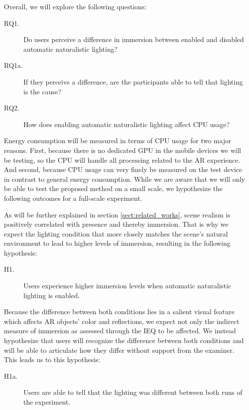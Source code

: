 \documentclass[12pt,twoside,english]{article}
\begin{document}
Overall, we will explore the following questions:

\begin{description}
    \item[RQ1.] Do users perceive a difference in immersion between enabled and disabled automatic naturalistic lighting?
    \item[RQ1a.] If they perceive a difference, are the participants able to tell that lighting is the cause?
    \item[RQ2.] How does enabling automatic naturalistic lighting affect \gls{CPU} usage?
\end{description}

Energy consumption will be measured in terms of \gls{CPU} usage for two major reasons.
First, because there is no dedicated \gls{GPU} in the mobile devices we will be testing, so the \gls{CPU} will handle all processing related to the \gls{AR} experience.
And second, because CPU usage can very finely be measured on the test device in contrast to general energy consumption.
While we are aware that we will only be able to test the proposed method on a small scale, we hypothesize the following outcomes for a full-scale experiment.


As will be further explained in section \ref{sect:related_works}, scene realism is positively correlated with presence and thereby immersion.
That is why we expect the lighting condition that more closely matches the scene's natural environment to lead to higher levels of immersion, resulting in the following hypothesis:

\begin{description}
    \item[H1.] Users experience higher immersion levels when automatic naturalistic lighting is enabled.
\end{description}

Because the difference between both conditions lies in a salient visual feature which affects \gls{AR} objects' color and reflections, we expect not only the indirect measure of immersion as assessed through the \gls{IEQ} to be affected.
We instead hypothesize that users will recognize the difference between both conditions and will be able to articulate how they differ without support from the examiner.
This leads us to this hypothesis:

\begin{description}
    \item[H1a.] Users are able to tell that the lighting was different between both runs of the experiment.
\end{description}
\end{document}
